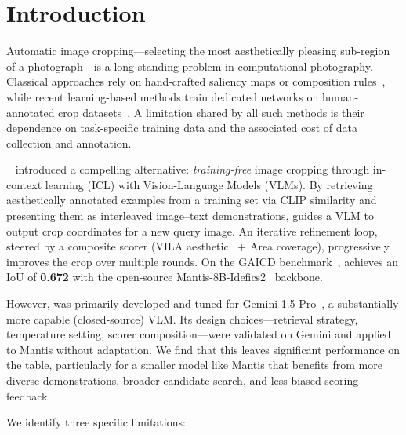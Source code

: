 \section{Introduction}
\label{sec:intro}

Automatic image cropping---selecting the most aesthetically pleasing
sub-region of a photograph---is a long-standing problem in computational
photography.  Classical approaches rely on hand-crafted saliency maps or
composition rules~\cite{cgs2017}, while recent learning-based methods
train dedicated networks on human-annotated crop
datasets~\cite{gaic2019, a2rl2018, gaicd2020}.  A limitation shared by
all such methods is their dependence on task-specific training data and
the associated cost of data collection and annotation.

\baseline~\cite{cropper2025} introduced a compelling alternative:
\emph{training-free} image cropping through in-context learning (ICL)
with Vision-Language Models (VLMs).  By retrieving aesthetically
annotated examples from a training set via CLIP similarity and
presenting them as interleaved image--text demonstrations, \baseline
guides a VLM to output crop coordinates for a new query image.  An
iterative refinement loop, steered by a composite scorer (VILA
aesthetic~\cite{vila2024} + Area coverage), progressively improves
the crop over multiple rounds.  On the GAICD benchmark~\cite{gaicd2020},
\baseline achieves an IoU of \textbf{0.672} with the open-source
Mantis-8B-Idefics2~\cite{mantis2024} backbone.

However, \baseline was primarily developed and tuned for Gemini 1.5
Pro~\cite{gemini2024}, a substantially more capable (closed-source) VLM.
Its design choices---retrieval strategy, temperature setting, scorer
composition---were validated on Gemini and applied to Mantis without
adaptation.  We find that this leaves significant performance on the
table, particularly for a smaller model like Mantis that benefits from
more diverse demonstrations, broader candidate search, and less biased
scoring feedback.

We identify three specific limitations:

